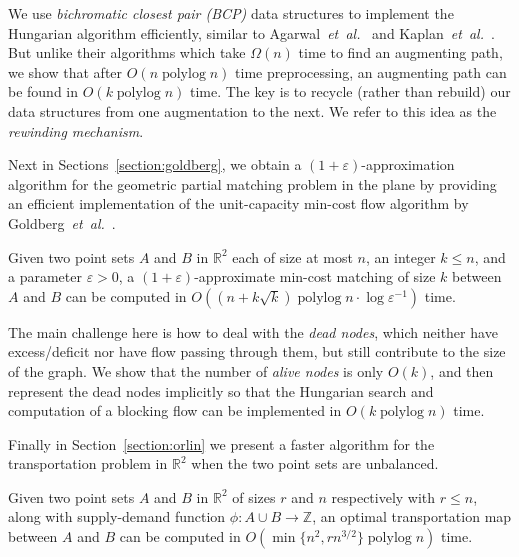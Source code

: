 \documentclass[a4paper,UKenglish,nolineno]{socg-lipics-v2019}
\def\etal{\emph{et~al.}}
\def\etal{\textit{et~al.}}
\def\polylog{\mathop{\mathrm{polylog}}}
\def\eps{\varepsilon}
\def\reals{\mathbb{R}}
\def\ints{\mathbb{Z}}
\def\tsupply{\phi}
\begin{document}
We use \emph{bichromatic closest pair (BCP)} data structures to implement the Hungarian algorithm efficiently, similar to Agarwal~\etal~\cite{AES99} and Kaplan~\etal~\cite{KMRSS17}.
But unlike their algorithms which take $\Omega(n)$ time to find an
augmenting path, we show that after $O(n\polylog n)$ time preprocessing,
an augmenting path can be found in $O(k\polylog n)$ time.
The key is to recycle (rather than rebuild) our data structures from one
augmentation to the next.
We refer to this idea as the \emph{rewinding mechanism}.

\medskip

Next in Sections~\ref{section:goldberg},
we obtain a $(1+\eps)$-approximation algorithm for the geometric partial
matching problem in the plane by providing an efficient implementation of the
unit-capacity min-cost flow algorithm by Goldberg~\etal~\cite{GHKT17}.

\begin{theorem}
\label{theorem:gmcm}
Given two point sets $A$ and $B$ in $\reals^2$ each of size at most $n$,
an integer $k \leq n$, and a parameter $\eps > 0$, a $(1+\eps)$-approximate
min-cost matching of size $k$ between $A$ and $B$ can be computed in
$O((n + k\sqrt{k})\polylog n \cdot \log\eps^{-1})$ time.
\end{theorem}

The main challenge here is how to deal with the \emph{dead nodes},
which neither have excess/deficit nor have flow passing through them,
but still contribute to the size of the graph.
We show that the number of \emph{alive nodes} is only $O(k)$, and then
represent the dead nodes implicitly so that the Hungarian search and
computation of a blocking flow can be implemented in $O(k\polylog n)$ time.

\medskip

Finally in Section~\ref{section:orlin} we present a faster algorithm for the
transportation problem in $\reals^2$ when the two point sets are unbalanced.

\begin{theorem}
\label{theorem:orlin}
Given two point sets $A$ and $B$ in $\reals^2$ of sizes $r$ and $n$ respectively
with $r \leq n$, along with supply-demand function $\tsupply:A \cup B \to \ints$,
an optimal transportation map between $A$ and $B$ can be computed in
$O(\min\{n^2, rn^{3/2}\}\polylog n)$ time.
\end{theorem}
\end{document}
